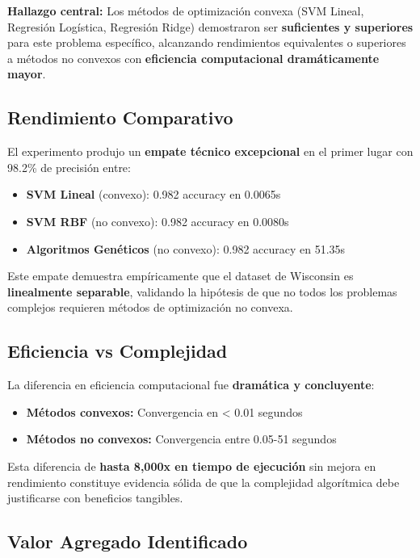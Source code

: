 \documentclass[12pt,a4paper]{article}
\begin{document}
\textbf{Hallazgo central:} Los métodos de optimización convexa (SVM Lineal, Regresión Logística, Regresión Ridge) demostraron ser \textbf{suficientes y superiores} para este problema específico, alcanzando rendimientos equivalentes o superiores a métodos no convexos con \textbf{eficiencia computacional dramáticamente mayor}.

\subsection{Rendimiento Comparativo}

El experimento produjo un \textbf{empate técnico excepcional} en el primer lugar con 98.2\% de precisión entre:
\begin{itemize}
    \item \textbf{SVM Lineal} (convexo): 0.982 accuracy en 0.0065s
    \item \textbf{SVM RBF} (no convexo): 0.982 accuracy en 0.0080s
    \item \textbf{Algoritmos Genéticos} (no convexo): 0.982 accuracy en 51.35s
\end{itemize}

Este empate demuestra empíricamente que el dataset de Wisconsin es \textbf{linealmente separable}, validando la hipótesis de que no todos los problemas complejos requieren métodos de optimización no convexa.

\subsection{Eficiencia vs Complejidad}

La diferencia en eficiencia computacional fue \textbf{dramática y concluyente}:
\begin{itemize}
    \item \textbf{Métodos convexos:} Convergencia en < 0.01 segundos
    \item \textbf{Métodos no convexos:} Convergencia entre 0.05-51 segundos
\end{itemize}

Esta diferencia de \textbf{hasta 8,000x en tiempo de ejecución} sin mejora en rendimiento constituye evidencia sólida de que la complejidad algorítmica debe justificarse con beneficios tangibles.

\subsection{Valor Agregado Identificado}
\end{document}
